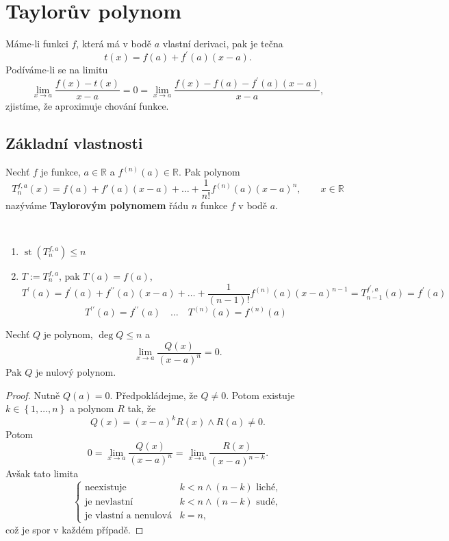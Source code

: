 \section{Taylorův polynom}
\begin{motivace}
	Máme-li funkci $f$, která má v bodě $a$ vlastní derivaci, pak je tečna
	$$
	    t(x) = f(a) + f^\prime(a)(x-a).
	$$
	Podíváme-li se na limitu
	$$
 \lim_{x \to a} \frac{f(x)-t(x)}{x-a} = 0 = \lim_{x \to a} \frac{f(x)-f(a)-f^\prime(a)(x-a)}{x-a},
	$$
	zjistíme, že aproximuje chování funkce.
\end{motivace}

\subsection{Základní vlastnosti}
\begin{definice}
Nechť $f$ je funkce, $a \in \mathbb{R}$ a $f^{(n)}(a) \in \mathbb{R}$. Pak polynom
\[
T^{f,a}_n(x) = f(a) + f'(a)(x - a) + \dots + \frac{1}{n!} f^{(n)}(a)(x - a)^n, \qquad x \in \mathbb R
\]
nazýváme \textbf{Taylorovým polynomem} řádu $n$ funkce $f$ v bodě $a$.
\end{definice}

\begin{poznamka}\,
\begin{enumerate}[(1)]
	\item $\operatorname{st} \left( T_n^{f,a} \right ) \leq n $
	\item $T:=T_n^{f,a}$, pak $T(a) = f(a)$,
	$$T^\prime(a) = f^\prime(a)+ f^{\prime\prime}(a)(x-a)+\dots+ \frac{1}{(n-1)!}f^{(n)}(a)(x-a)^{n-1}=T_{n-1}^{f^\prime,a}(a)=f^\prime(a)$$
	$$
	    T^{\prime\prime}(a) = f^{\prime\prime}(a)\quad \dots\quad T^{(n)}(a)=f^{(n)}(a)
	$$
\end{enumerate}
\end{poznamka}

\begin{lemma}\label{lemma6.1.}
Nechť $Q$ je polynom, $\deg Q \le n$ a
\[
\lim_{x \to a} \frac{Q(x)}{(x-a)^n} = 0.
\]
Pak $Q$ je nulový polynom.
\end{lemma}

\begin{proof}
	Nutně $Q(a)=0$. Předpokládejme, že $Q\ne 0$. Potom existuje $k\in \left \{ 1,\dots,n \right \} $
	a polynom $R$ tak, že $$Q(x)=(x-a)^kR(x) \land R(a) \ne 0.$$ Potom
	$$
	    0=\lim_{x\to a} \frac{Q(x)}{(x-a)^n}=\lim_{x\to a} \frac{R(x)}{(x-a)^{n-k}}.
	$$
	Avšak tato limita
	$$
 \begin{cases}
		\textrm{neexistuje} & k<n \land (n-k) \textrm{ liché},\\
		\textrm{je nevlastní} & k <n \land (n-k) \textrm{ sudé},\\
		\textrm{je vlastní a nenulová} & k=n,
 \end{cases}
	$$
	což je spor v každém případě.
\end{proof}

